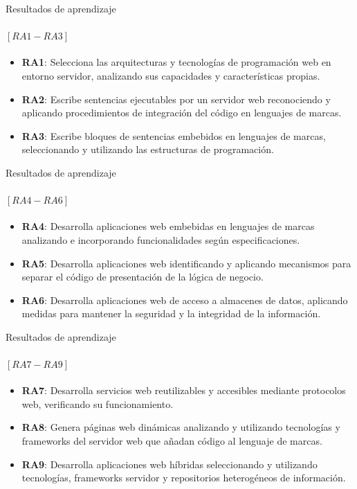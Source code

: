 \documentclass{beamer}
\begin{document}
\begin{frame}{Resultados de aprendizaje}
    \framesubtitle{$[RA1-RA3]$}
    \begin{itemize}
        \item \textbf{RA1}: Selecciona las arquitecturas y tecnologías de programación web en entorno servidor, analizando sus capacidades y características propias.
        \item \textbf{RA2}: Escribe sentencias ejecutables por un servidor web reconociendo y aplicando procedimientos de integración del código en lenguajes de marcas.
        \item \textbf{RA3}: Escribe bloques de sentencias embebidos en lenguajes de marcas, seleccionando y utilizando las estructuras de programación.
    \end{itemize}
\end{frame}

\begin{frame}{Resultados de aprendizaje}
    \framesubtitle{$[RA4-RA6]$}
    \begin{itemize}
        \item \textbf{RA4}: Desarrolla aplicaciones web embebidas en lenguajes de marcas analizando e incorporando funcionalidades según especificaciones.
        \item \textbf{RA5}: Desarrolla aplicaciones web identificando y aplicando mecanismos para separar el código de presentación de la lógica de negocio.
        \item \textbf{RA6}: Desarrolla aplicaciones web de acceso a almacenes de datos, aplicando medidas para mantener la seguridad y la integridad de la información.
    \end{itemize}
\end{frame}

\begin{frame}{Resultados de aprendizaje}
    \framesubtitle{$[RA7-RA9]$}
    \begin{itemize}
        \item \textbf{RA7}: Desarrolla servicios web reutilizables y accesibles mediante protocolos web, verificando su funcionamiento.
        \item \textbf{RA8}: Genera páginas web dinámicas analizando y utilizando tecnologías y frameworks del servidor web que añadan código al lenguaje de marcas.
        \item \textbf{RA9}: Desarrolla aplicaciones web híbridas seleccionando y utilizando tecnologías, frameworks servidor y repositorios heterogéneos de información.
    \end{itemize}
\end{frame}
\end{document}

